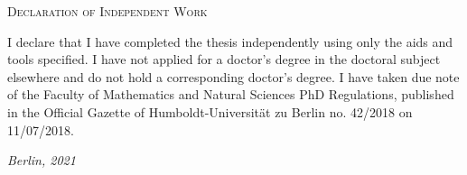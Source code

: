 \pagestyle{empty}

\begin{center}
  \textsc{Declaration of Independent Work}
\end{center}
%
I declare that I have completed the thesis independently using only the aids
and tools specified. I have not applied for a doctor’s degree in the doctoral
subject elsewhere and do not hold a corresponding doctor’s degree. I have taken
due note of the Faculty of Mathematics and Natural Sciences PhD Regulations,
published in the Official Gazette of Humboldt-Universität zu Berlin no. 42/2018
on 11/07/2018.

\vspace{\baselineskip}
\noindent
\textit{Berlin, 2021}

\hfill
\begin{minipage}[t]{0.4\linewidth}
\end{minipage}
